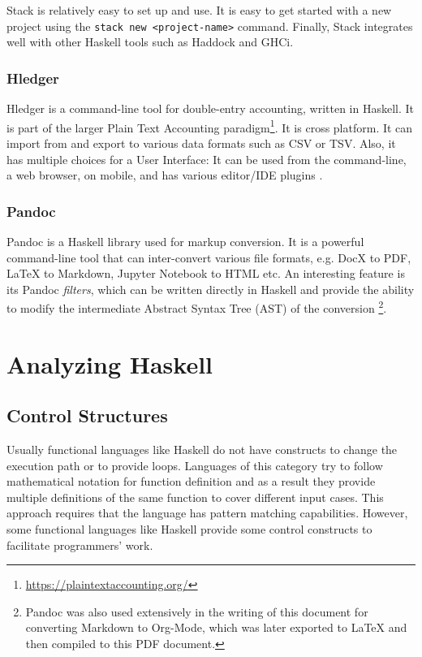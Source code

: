 \documentclass[a4paper, titlepage, twoside]{article}
\begin{document}
Stack is relatively easy to set up and use. It is easy to get started with a new project using the \texttt{stack new <project-name>} command. Finally, Stack integrates well with other Haskell tools such as Haddock and GHCi.

\subsubsection{Hledger}
\label{sec:org99b5fff}

Hledger is a command-line tool for double-entry accounting, written in Haskell. It is part of the larger Plain Text Accounting paradigm\footnote{\url{https://plaintextaccounting.org/}}. It is cross platform. It can import from and export to various data formats such as CSV or TSV. Also, it has multiple choices for a User Interface: It can be used from the command-line, a web browser, on mobile, and has various editor/IDE plugins \autocite{michaelHledger2023}.

\subsubsection{Pandoc}
\label{sec:orgc781dae}

Pandoc is a Haskell library used for markup conversion. It is a powerful command-line tool that can inter-convert various file formats, e.g. DocX to PDF, \LaTeX{} to Markdown, Jupyter Notebook to HTML etc. An interesting feature is its Pandoc \emph{filters}, which can be written directly in Haskell and provide the ability to modify the intermediate Abstract Syntax Tree (AST) of the conversion \autocite{macfarlanePandoc2023}\footnote{Pandoc was also used extensively in the writing of this document for converting Markdown to Org-Mode, which was later exported to \LaTeX{} and then compiled to this PDF document.}.

\section{Analyzing Haskell}
\label{sec:org72fd18f}

\subsection{Control Structures}
\label{sec:orgba9cb29}

Usually functional languages like Haskell do not have constructs to change the execution path or to provide loops. Languages of this category try to follow mathematical notation for function definition and as a result they provide multiple definitions of the same function to cover different input cases. This approach requires that the language has pattern matching capabilities. However, some functional languages like Haskell provide some control constructs to facilitate programmers' work.
\end{document}
